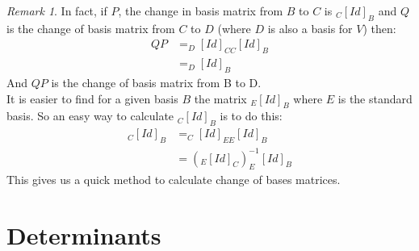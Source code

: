 \documentclass{report}
\theoremstyle{remark}
\newtheorem{remark}[theorem]{Remark}
\theoremstyle{definition}
\theoremstyle{definition}
\theoremstyle{theorem}
\begin{document}
\begin{remark}
In fact, if $P$, the change in basis matrix from $B$ to $C$ is $_C[Id]_B$ and $Q$ is the change of basis matrix from $C$ to $D$ (where $D$ is also a basis for $V$) then:
\begin{align*}
    QP&=_D[Id]_{CC}[Id]_B\\
    &=_D[Id]_B
\end{align*}
And $QP$ is the change of basis matrix from B to D. \vspace{3mm} \\
It is easier to find for a given basis $B$ the matrix $_E[Id]_B$ where $E$ is the standard basis. So an easy way to calculate $_C[Id]_B$ is to do this:
\begin{align*}
    _C[Id]_B&=_C[Id]_{EE}[Id]_B\\
    &=(_E[Id]_C)^{-1}_E[Id]_B
\end{align*}
This gives us a quick method to calculate change of bases matrices.
\end{remark}
\section{Determinants}
\end{document}
